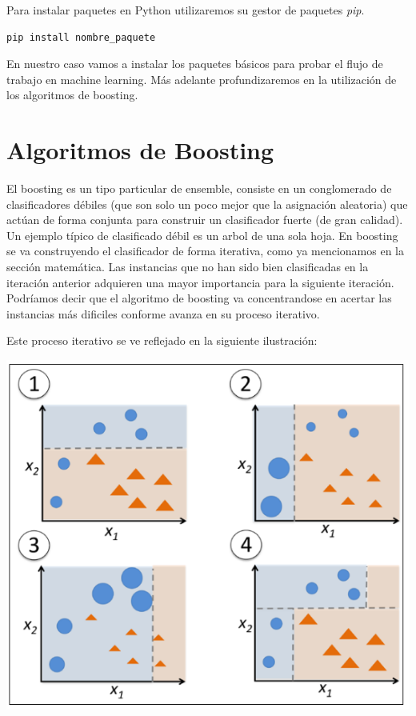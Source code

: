 Para instalar paquetes en Python utilizaremos su gestor de paquetes \textit{pip}.

\begin{lstlisting}
pip install nombre_paquete
\end{lstlisting}

En nuestro caso vamos a instalar los paquetes básicos para probar el flujo de trabajo en machine learning.  
Más adelante profundizaremos en la utilización de los algoritmos de boosting.  

\pagebreak





\section{Algoritmos de Boosting}

El boosting es un tipo particular de ensemble, consiste en un conglomerado de  clasificadores débiles (que son solo un poco mejor que la asignación aleatoria) que actúan de forma conjunta para construir un clasificador fuerte (de gran calidad). Un ejemplo típico de clasificado débil es un arbol de una sola hoja.  
En boosting se va construyendo el clasificador de forma iterativa, como ya mencionamos en la sección matemática.  
Las instancias que no han sido bien clasificadas en la iteración anterior adquieren una mayor importancia para la siguiente iteración. Podríamos decir que el algoritmo de boosting va concentrandose en acertar las instancias más dificiles conforme avanza en su proceso iterativo.  

Este proceso iterativo se ve reflejado en la siguiente ilustración:
\begin{center}
\includegraphics[scale=0.7]{./img/adaboost.png}
\end{center}

